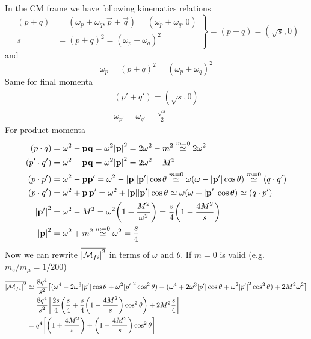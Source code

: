 \documentclass[TheoreticalPhy_ModB.tex]{subfiles}
\begin{document}
In the CM frame we have following kinematics relations
\[
\left.
\begin{aligned}
(p + q)	& = (\omega_p + \omega_q, \vec{p} + \vec{q}) = (\omega_p + \omega_q, 0) \\
s 		& = (p + q)^2 = (\omega_p + \omega_q)^2
\end{aligned}
\right \} = (p + q) = (\sqrt{s}, 0)
\]
and
\[
\omega_p = (p + q)^2 = (\omega_p + \omega_q)^2
\]
Same for final momenta
\begin{gather*}
(p' + q') = (\sqrt{s}, 0) \\
\omega_{p'} = \omega_{q'} = \frac{\sqrt{s}}{2}
\end{gather*}
For product momenta
\begin{align*}
(p \cdot q) 		& = \omega^2 - \mathbf{p}\mathbf{q} = \omega^2 \abs{\mathbf{p}}^2 = 2 \omega^2 - m^2 
	\overset{m=0}{\simeq} 2\omega^2 \\
(p' \cdot q') 		& = \omega^2 - \mathbf{p}\mathbf{q} = \omega^2 \abs{\mathbf{p}}^2 = 2 \omega^2 - M^2 \notag \\
(p \cdot p') 		& = \omega^2 - \mathbf{p}\mathbf{p'} = \omega^2 - \abs{\mathbf{p}}\abs{\mathbf{p'}}\cos \theta 
	\overset{m = 0}{\simeq} \omega(\omega - \abs{\mathbf{p'}} \cos \theta)
	\overset{m = 0}{\simeq} (q \cdot q') \\
(p \cdot q')		& = \omega^2 + \mathbf{p}\, \mathbf{p'} = \omega^2 + \abs{\mathbf{p}}\abs{\mathbf{p'}}\cos \theta 
	\simeq \omega(\omega + \abs{\mathbf{p'}}\cos \theta) \simeq (q \cdot p') \\
\abs{\mathbf{p'}}^2 	& = \omega^2 - M^2 = \omega^2 \biggl( 1 - \frac{M^2}{\omega^2} \biggr)
	= \frac{s}{4} \biggl( 1 - \frac{4M^2}{s} \biggr) \\
\abs{\mathbf{p}}^2 	& = \omega^2 + m^2 \overset{m = 0}{\simeq} \omega^2 = \frac{s}{4}
\end{align*}
Now we can rewrite $\overline{\abs{\mathcal{M}_{fi}}^2}$ in terms of $\omega$ and $\theta$. If $m=0$ is valid (e.g. $m_e/m_{\mu} = 1/200$)
\begin{align*}
\overline{\abs{\mathcal{M}_{fi}}^2}
	& \simeq \frac{8q^4}{s^2} \bigl[ (\omega^4 - 2 \omega^3 \abs{p'} \cos \theta + \omega^2 \abs{p'}^2 \cos^2 \theta) 
		+ (\omega^4 + 2 \omega^3 \abs{p'} \cos \theta + \omega^2 \abs{p'}^2 \cos^2 \theta) + 2M^2\omega^2 \bigr] \\
	& = \frac{8q^4}{s^2} \biggl[ \frac{2s}{4} \biggl( \frac{s}{4} + \frac{s}{4} \biggl( 1 - \frac{4M^2}{s} \biggr) \cos^2 \theta \biggr)
		+ 2M^2 \frac{s}{4} \biggr]	\\
	& = q^4 \biggl[ \biggl( 1 + \frac{4M^2}{s} \biggr) + \biggl( 1 - \frac{4M^2}{s} \biggr) \cos^2 \theta \biggr] 				 
\end{align*}
\end{document}
